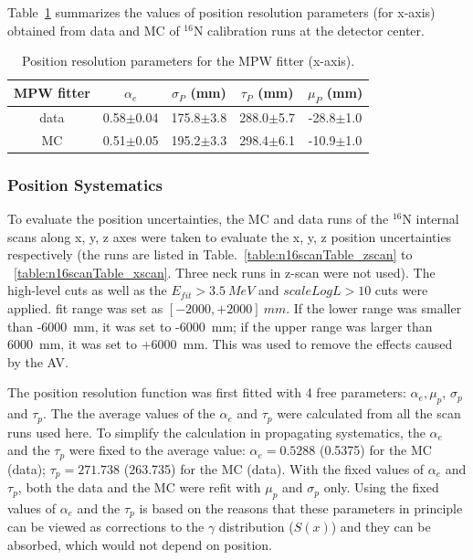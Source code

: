 Table~\ref{table_posresol} summarizes the values of position resolution parameters (for x-axis) obtained from data and MC of {$^{16}$}N calibration runs at the detector center.
\vspace{1mm}
\begin{table}[ht]
	\centering
	\caption{Position resolution parameters for the MPW fitter (x-axis).}
	\label{table_posresol}
	\begin{tabular}{ccccc}
		\toprule
		MPW fitter & $\alpha_e$ & $\sigma_P$ (mm) &  $\tau_P$ (mm)& $\mu_P$ (mm)\\
		\hline 
		data& 0.58$\pm$0.04 & 175.8$\pm$3.8 & 288.0$\pm$5.7 & -28.8$\pm$1.0\\	
		\hline 
		MC & 0.51$\pm$0.05 & 195.2$\pm$3.3 & 298.4$\pm$6.1 & -10.9$\pm$1.0\\
		\bottomrule
	\end{tabular}
\end{table}
\vspace{1mm}

\subsubsection{Position Systematics}
To evaluate the position uncertainties, the MC and data runs of the $^{16}$N internal scans along x, y, z axes were taken to evaluate the x, y, z position uncertainties respectively (the runs are listed in Table.~\ref{table:n16scanTable_zscan} to ~\ref{table:n16scanTable_xscan}. Three neck runs in z-scan were not used). The high-level cuts as well as the $E_{fit}>3.5~MeV$ and $scaleLogL>10$ cuts were applied. 
fit range was set as $[-2000, +2000]~mm$. If the lower range was smaller than -6000~mm, it was set to -6000~mm; if the upper range was larger than 6000~mm, it was set to +6000~mm. This was used to remove the effects caused by the AV.

The position resolution function was first fitted with 4 free parameters: $\alpha_e,\mu_p$, $\sigma_p$ and $\tau_p$. The the average values of the $\alpha_e$
and $\tau_p$ were calculated from all the scan runs used here. To simplify the calculation in propagating systematics, the $\alpha_e$ and the $\tau_p$ were fixed to the average value: $\alpha_e=0.5288$ (0.5375) for the MC (data); $\tau_p=271.738$ (263.735) for the MC (data). With the fixed values of $\alpha_e$ and $\tau_p$, both the data and the MC were refit with $\mu_p$ and $\sigma_p$ only. Using the fixed values of $\alpha_e$ and the $\tau_p$ is based on the reasons that these parameters in principle can be viewed as corrections to the $\gamma$ distribution ($S(x)$) and they can be absorbed, which would not depend on position\cite{waterunidoc}. 

